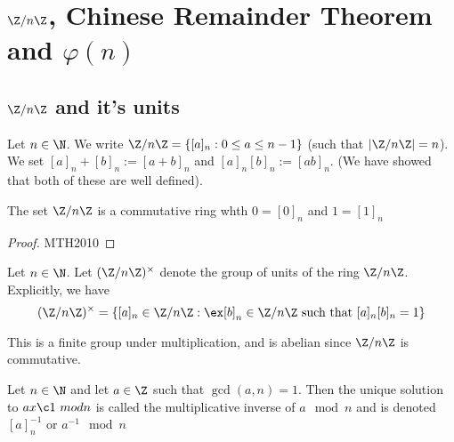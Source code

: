 
\section{$\Z/n\Z$, Chinese Remainder Theorem and $\varphi(n)$}

\subsection{$\Z/n\Z$ and it's units}

\begin{ndefi}[]
  Let $n \in \N$. We write $\Z/n\Z = \{[a]_n : 0 \le a \le n - 1\}$ (such that $|\Z/n\Z|=n$). We set $[a]_n + [b]_n := [a + b]_n$ and $[a]_n[b]_n := [ab]_n$. (We have showed that both of these are well defined).
\end{ndefi}

\begin{nlemma}
  The set $\Z/n\Z$ is a commutative ring whth $0 = [0]_n$ and $1 = [1]_n$
\end{nlemma}
\begin{proof}
  MTH2010
\end{proof}

\begin{ndefi}[]
  Let $n \in \N$. Let $(\Z/n\Z)^\times$ denote the group of units of the ring $\Z/n\Z$. Explicitly, we have
  $$ (\Z/n\Z)^\times = \{[a]_n \in \Z/n\Z : \ex [b]_n \in \Z/n\Z \text{ such that $[a]_n[b]_n = 1$}\} $$
\end{ndefi}
This is a finite group under multiplication, and is abelian since $\Z/n\Z$ is commutative.

\begin{ndefi}
  Let $n \in \N$ and let $a \in \Z$ such that $\gcd (a, n) = 1$. Then the unique solution to $ax \c 1\ mod n$ is called the multiplicative inverse of $a \mod n$ and is denoted $[a]_n^{-1}$ or $a^{-1}\mod n$
\end{ndefi}

